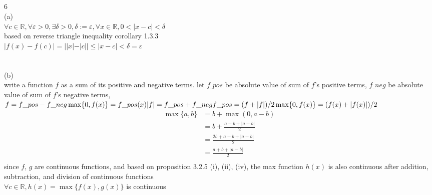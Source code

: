\documentclass[12pt, border = 4pt, multi]{article} %
\begin{document}
\\
\\
\\
\\
6\\
(a)\\
$\forall c \in \mathbb{R}, \forall \varepsilon > 0, \exists \delta > 0, \delta := \varepsilon, \forall x \in \mathbb{R}, 0 < |x - c| < \delta$\\
based on reverse triangle inequality corollary 1.3.3\\
$|f(x) - f(c)| = ||x| - |c|| \leq |x - c| < \delta = \varepsilon$\\
\\
\\
(b)\\
write a function $f$ as a sum of its positive and negative terms. let $f\_{pos}$ be absolute value of sum of $f$'s positive terms, $f\_{neg}$ be absolute value of sum of $f$'s negative terms, $
f = f\_{pos} - f\_{neg}\\
\max\{0, f(x)\} = f\_{pos}(x)\\
|f| = f\_{pos} + f\_{neg}\\
f\_{pos} = (f + |f|) / 2\\
\max\{0, f(x)\} = (f(x) + |f(x)|) / 2$\\
\begin{align*}
\max\{a, b\} &= b + \max(0, a - b)\\
&= b + \frac{a - b + |a - b|}{2}\\
&= \frac{2b + a - b + |a - b|}{2}\\
&= \frac{a + b + |a - b|}{2}\\
\end{align*}
since $f$, $g$ are continuous functions, and based on proposition 3.2.5 (i), (ii), (iv), the max function $h(x)$ is also continuous after addition, subtraction, and division of continuous functions\\
$\forall c \in \mathbb{R}, h(x) = \max\{f(x), g(x)\}$ is continuous
\end{document}

